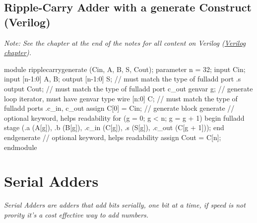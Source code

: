 \documentclass[12pt,openany]{book}
\begin{document}
\subsection{Ripple-Carry Adder with a generate Construct (Verilog)}
 \textit{Note: See the chapter at the end of the notes for all content on Verilog (\hyperref[Verilog]{Verilog chapter}).}


\begin{minipage}[htp]{1\textwidth}
	\begin{vhdl}
module ripplecarrygenerate (Cin, A, B, S, Cout);
	parameter n = 32;
	input Cin;
	input [n-1:0] A, B;
	output [n-1:0] S; // must match the type of fulladd port .s
	output Cout; // must match the type of fulladd port c_out
	genvar g; // generate loop iterator, must have genvar type
	wire [n:0] C; // must match the type of fulladd ports .c_in, c_out
	assign C[0] = Cin;
	// generate block
	generate // optional keyword, helps readability
	for (g = 0; g < n; g = g + 1) begin
	fulladd stage (.a (A[g]), .b (B[g]), .c_in (C[g]), .s (S[g]), .c_out (C[g + 1]));
	end
	endgenerate // optional keyword, helps readability
	assign Cout = C[n];
endmodule
	\end{vhdl}
\end{minipage}
\section{Serial Adders}
\textit{Serial Adders are adders that add bits serially, one bit at a time, if speed is not prority it's a cost effective way to add numbers.}
\end{document}
